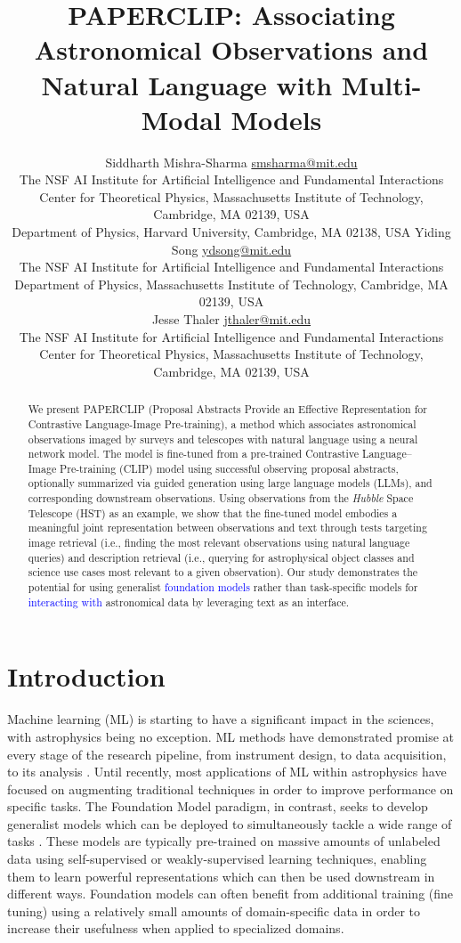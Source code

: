 \documentclass[10pt]{article} %
\title{\textsc{PAPERCLIP}: Associating Astronomical Observations and Natural Language with Multi-Modal Models}
\author{\name Siddharth Mishra-Sharma \email \href{mailto:smsharma@mit.edu}{smsharma@mit.edu} \\
      \addr The NSF AI Institute for Artificial Intelligence and Fundamental Interactions\\
      Center for Theoretical Physics, Massachusetts Institute of Technology, Cambridge, MA 02139, USA \\
      Department of Physics, Harvard University, Cambridge, MA 02138, USA
      \AND
      \name Yiding Song \email \href{mailto:ydsong@mit.edu}{ydsong@mit.edu} \\
      \addr The NSF AI Institute for Artificial Intelligence and Fundamental Interactions\\
      Department of Physics, Massachusetts Institute of Technology, Cambridge, MA 02139, USA \\
      \AND
      \name Jesse Thaler \email \href{mailto:jthaler@mit.edu}{jthaler@mit.edu} \\
      \addr The NSF AI Institute for Artificial Intelligence and Fundamental Interactions\\
      Center for Theoretical Physics, Massachusetts Institute of Technology, Cambridge, MA 02139, USA \\
}
\newcommand{\githubmaster}{\href{https://www.github.com/smsharma/PAPERCLIP-Hubble}{\faGithub}\xspace}
\newcommand{\hubble}{\emph{Hubble}\xspace}
\newcommand{\changes}[1]{\textcolor{blue}{#1}}
\begin{document}
\maketitle

\thispagestyle{firstpage}

\begin{abstract}
We present PAPERCLIP (Proposal Abstracts Provide an Effective Representation for Contrastive Language-Image Pre-training), a method which associates astronomical observations imaged by surveys and telescopes with natural language  using a neural network model. The model is fine-tuned from a pre-trained Contrastive Language–Image Pre-training (CLIP) model using successful observing proposal abstracts, optionally summarized via guided generation using large language models (LLMs), and corresponding downstream observations. Using observations from the \hubble Space Telescope (HST) as an example, we show that the fine-tuned model embodies a meaningful joint representation between observations and text through tests targeting image retrieval (i.e., finding the most relevant observations using natural language queries) and description retrieval (i.e., querying for astrophysical object classes and science use cases most relevant to a given observation). Our study demonstrates the potential for using generalist \changes{foundation models} rather than task-specific models for \changes{interacting with} astronomical data by leveraging text as an interface. \githubmaster
\end{abstract}

\tableofcontents

\section{Introduction}
\label{sec:intro}

Machine learning (ML) is starting to have a significant impact in the sciences, with astrophysics being no exception.
%
ML methods have demonstrated promise at every stage of the research pipeline, from instrument design, to data acquisition, to its analysis \citep{huertas2022dawes}.
%
Until recently, most applications of ML within astrophysics have focused on augmenting traditional techniques in order to improve performance on specific tasks.
%
The {Foundation Model} paradigm, in contrast, seeks to develop generalist models which can be deployed to simultaneously tackle a wide range of tasks \citep{bommasani2021opportunities}.
%
These models are typically pre-trained on massive amounts of unlabeled data using self-supervised or weakly-supervised learning techniques, enabling them to learn powerful representations which can then be used downstream in different ways.
%
Foundation models can often benefit from additional training ({fine tuning}) using a relatively small amounts of domain-specific data in order to increase their usefulness when applied to specialized domains.
\end{document}
